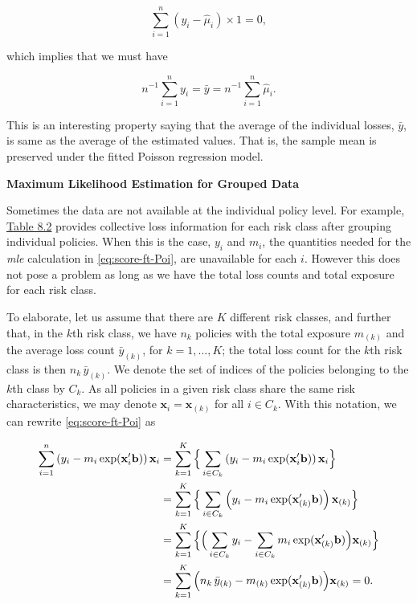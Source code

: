 \documentclass[]{book}
\theoremstyle{definition}
\theoremstyle{definition}
\theoremstyle{definition}
\theoremstyle{remark}
\begin{document}
\begin{equation}
\sum^n_{i=1}\left( y_i -\hat{\mu}_i \right)\times 1={ 0},
\end{equation}

which implies that we must have

\begin{equation}
n^{-1}\sum_{i=1}^n y_i =\bar{y}=n^{-1}\sum_{i=1}^n \hat{\mu}_i.
\end{equation}

This is an interesting property saying that the average of the
individual losses, \(\bar{y}\), is same as the average of the estimated
values. That is, the sample mean is preserved under the fitted Poisson
regression model.

\textbf{Maximum Likelihood Estimation for Grouped Data}

Sometimes the data are not available at the individual policy level. For
example, \protect\hyperlink{tab:8.2}{Table 8.2} provides collective loss
information for each risk class after grouping individual policies. When
this is the case, \(y_i\) and \(m_i\), the quantities needed for the
\emph{mle} calculation in \eqref{eq:score-ft-Poi}, are unavailable for
each \(i\). However this does not pose a problem as long as we have the
total loss counts and total exposure for each risk class.

To elaborate, let us assume that there are \(K\) different risk classes,
and further that, in the \(k\)th risk class, we have \(n_k\) policies
with the total exposure \(m_{(k)}\) and the average loss count
\(\bar{y}_{(k)}\), for \(k=1, \ldots, K\); the total loss count for the
\(k\)th risk class is then \(n_k\, \bar{y}_{(k)}\). We denote the set of
indices of the policies belonging to the \(k\)th class by \(C_k\). As
all policies in a given risk class share the same risk characteristics,
we may denote \(\mathbf{ x}_i=\mathbf{ x}_{(k)}\) for all \(i \in C_k\).
With this notation, we can rewrite \eqref{eq:score-ft-Poi} as

\begin{align}
\nonumber \sum^n_{i=1} \left(y_i -m_i \exp(\mathbf{ x}^{\prime}_i \mathbf{ b}) \right)\mathbf{ x}_i &= \sum^K_{k=1}\Big{\{}\sum_{i \in C_k} \left(y_i -m_i \exp(\mathbf{ x}^{\prime}_i \mathbf{ b}) \right)\mathbf{ x}_i  \Big{\}} \\
\nonumber     &  =\sum^K_{k=1}\Big{\{} \sum_{i \in C_k} \left(y_i -m_i \exp(\mathbf{ x}^{\prime}_{(k)} \mathbf{ b}) \right)\mathbf{ x}_{(k)}  \Big{\}} \\
\nonumber     &  =\sum^K_{k=1}\Big{\{}  \Big(\sum_{i \in C_k}y_i -\sum_{i \in C_k}m_i \exp(\mathbf{ x}^{\prime}_{(k)} \mathbf{ b}) \Big)\mathbf{ x}_{(k)}  \Big{\}} \\
      &  =\sum^K_{k=1} \Big(n_k\, \bar{y}_{(k)}-m_{(k)} \exp(\mathbf{ x}^{\prime}_{(k)} \mathbf{ b}) \Big)\mathbf{ x}_{(k)} =0.
\label{eq:score-ft-Poi-2}
\end{align}
\end{document}

